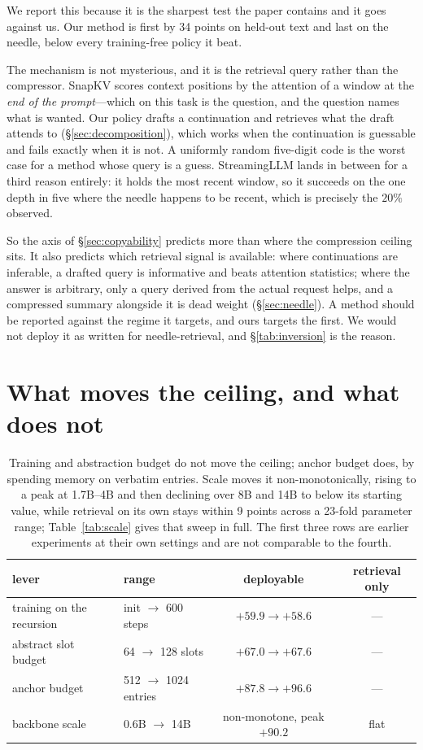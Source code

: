\documentclass[11pt]{article}
\begin{document}
We report this because it is the sharpest test the paper contains and it goes
against us. Our method is first by 34 points on held-out text and last on the
needle, below every training-free policy it beat.

The mechanism is not mysterious, and it is the retrieval query rather than the
compressor. SnapKV scores context positions by the attention of a window at the
\emph{end of the prompt}---which on this task is the question, and the question
names what is wanted. Our policy drafts a continuation and retrieves what the
draft attends to (\S\ref{sec:decomposition}), which works when the continuation
is guessable and fails exactly when it is not. A uniformly random five-digit
code is the worst case for a method whose query is a guess. StreamingLLM lands
in between for a third reason entirely: it holds the most recent window, so it
succeeds on the one depth in five where the needle happens to be recent, which
is precisely the $20\%$ observed.

So the axis of \S\ref{sec:copyability} predicts more than where the compression
ceiling sits. It also predicts which retrieval signal is available: where
continuations are inferable, a drafted query is informative and beats attention
statistics; where the answer is arbitrary, only a query derived from the actual
request helps, and a compressed summary alongside it is dead weight
(\S\ref{sec:needle}). A method should be reported against the regime it targets,
and ours targets the first. We would not deploy it as written for
needle-retrieval, and \S\ref{tab:inversion} is the reason.

\section{What moves the ceiling, and what does not}
\label{sec:levers}

\begin{table}[ht]
\centering
\small
\begin{tabular}{llcc}
\toprule
lever & range & deployable & retrieval only \\
\midrule
training on the recursion & init $\to$ 600 steps & $+59.9 \to +58.6$ & --- \\
abstract slot budget      & 64 $\to$ 128 slots   & $+67.0 \to +67.6$ & --- \\
anchor budget             & 512 $\to$ 1024 entries & $+87.8 \to +96.6$ & --- \\
\midrule
backbone scale & 0.6B $\to$ 14B & non-monotone, peak $\mathbf{+90.2}$ & flat \\
\bottomrule
\end{tabular}
\caption{Training and abstraction budget do not move the ceiling; anchor budget
does, by spending memory on verbatim entries. Scale moves it non-monotonically,
rising to a peak at 1.7B--4B and then declining over 8B and 14B to below its
starting value, while retrieval on its own stays within 9 points across a
23-fold parameter range; Table~\ref{tab:scale} gives that sweep in full. The first three rows are earlier experiments at their own
settings and are not comparable to the fourth.}
\label{tab:levers}
\end{table}
\end{document}
